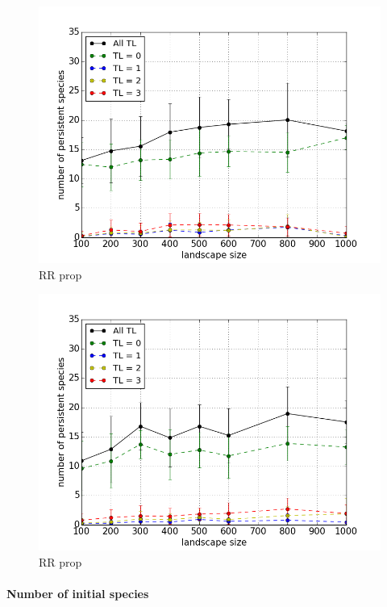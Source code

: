 \begin{figure}
	\centering
	\includegraphics[width=1.0\linewidth]{"figures/ls_v_comp_mai00_standard"}
	\caption{RR prop}
	\label{fig:ls_v_comp_mai00}
\end{figure}
 
\begin{figure}
	\centering
	\includegraphics[width=1.0\linewidth]{"figures/ls_v_comp_mai05_standard"}
	\caption{RR prop}
	\label{fig:ls_v_comp_mai05}
\end{figure}


\paragraph*{Number of initial species}

